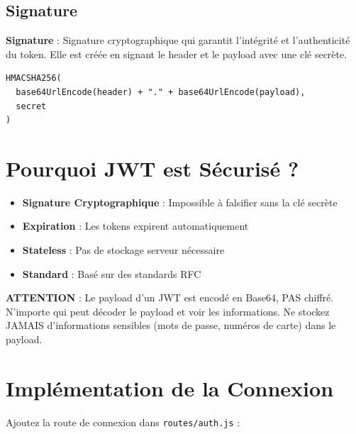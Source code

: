 \subsection{Signature}

\begin{definitionbox}
    \textbf{Signature} : Signature cryptographique qui garantit l'intégrité et l'authenticité du token. Elle est créée en signant le header et le payload avec une clé secrète.
\end{definitionbox}

\begin{lstlisting}[style=javascript]
HMACSHA256(
  base64UrlEncode(header) + "." + base64UrlEncode(payload),
  secret
)
\end{lstlisting}

\section{Pourquoi JWT est Sécurisé ?}

\begin{itemize}
    \item \textbf{Signature Cryptographique} : Impossible à falsifier sans la clé secrète
    \item \textbf{Expiration} : Les tokens expirent automatiquement
    \item \textbf{Stateless} : Pas de stockage serveur nécessaire
    \item \textbf{Standard} : Basé sur des standards RFC
\end{itemize}

\begin{securitybox}
    \textbf{ATTENTION} : Le payload d'un JWT est encodé en Base64, PAS chiffré. N'importe qui peut décoder le payload et voir les informations. Ne stockez JAMAIS d'informations sensibles (mots de passe, numéros de carte) dans le payload.
\end{securitybox}

\section{Implémentation de la Connexion}

Ajoutez la route de connexion dans \texttt{routes/auth.js} :

